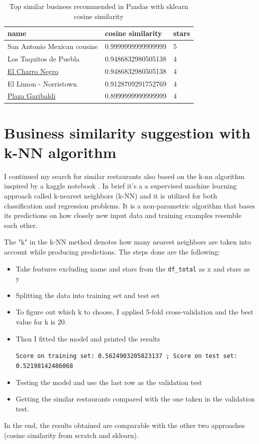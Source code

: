 \documentclass[12pt,english]{report}
\begin{document}
\begin{table}[]
\caption{Top similar business recommended in Pandas with sklearn cosine similarity}
\label{tab:simrespandsklearn}
\begin{tabular}{|l|l|l|}
\hline
name                        & cosine similarity  & stars \\ \hline
San Antonio Mexican cousine & 0.9999999999999999 & 5     \\ \hline
Los Taquitos de Puebla      & 0.9486832980505138 & 4     \\ \hline
\href{https://www.yelp.com/biz/ecowas-african-restaurant-philadelphia-2}{El Charro Negro            } & 0.9486832980505138 & 4     \\ \hline
El Limon - Norristown       & 0.9128709291752769 & 4     \\ \hline
\href{https://www.yelp.com/biz/plaza-garibaldi-philadelphia-3?osq=Plaza+Garibaldi}{Plaza Garibaldi}             & 0.8999999999999999 & 4     \\ \hline
\end{tabular}
\end{table}
\section{Business similarity suggestion with k-NN algorithm}\label{sec:knn-sim}
I continued my search for similar restaurants also based on the k-nn algorithm inspired by a kaggle notebook \cite{notekaggle}. In brief it's a a supervised machine learning approach called k-nearest neighbors (k-NN) and it is utilized for both classification and regression problems. It is a non-parametric algorithm that bases its predictions on how closely new input data and training examples resemble each other. \par
The "k" in the k-NN method denotes how many nearest neighbors are taken into account while producing predictions.
The steps done are the following: 
\begin{itemize}
\item Take features excluding name and stars from the \texttt{df\_total} as x and stars as y
\item Splitting the data into training set and test set 
\item To figure out which k to choose, I applied 5-fold cross-validation and the best value for k is 20.
\item Then I fitted the model and printed the results \par
\texttt{Score on training set: 0.5624903205823137 ; Score on test set: 0.52198142486068}
\item Testing the model and use the last row as the validation test 
\item Getting the similar restaurants compared with the one taken in the validation test.
\end{itemize}
In the end, the results obtained are comparable with the other two approaches (cosine similarity from scratch and sklearn).
\end{document}
